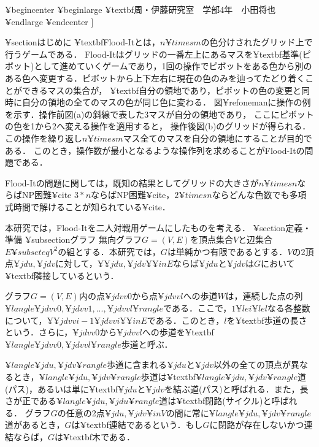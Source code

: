 ¥begin{center}
	¥begin{large}
		¥textbf{周・伊藤研究室　学部4年　小田将也}
	¥end{large}
¥end{center}
]

¥section{はじめに}
¥textbf{Flood-It}とは，$n ¥times m$の色分けされたグリッド上で行うゲームである．
Flood-Itはグリッドの一番左上にあるマスを¥textbf{基準(ピボット)}として進めていくゲームであり，1回の操作でピボットをある色から別のある色へ変更する．ピボットから上下左右に現在の色のみを辿ってたどり着くことができるマスの集合が，
¥textbf{自分の領地}であり，ピボットの色の変更と同時に自分の領地の全てのマスの色が同じ色に変わる．
図¥ref{oneman}に操作の例を示す．操作前図(a)の斜線で表した3マスが自分の領地であり，
ここにピボットの色を1から2へ変える操作を適用すると，
操作後図(b)のグリッドが得られる．この操作を繰り返し$n ¥times m$マス全てのマスを自分の領地にすることが目的である．
このとき，操作数が最小となるような操作列を求めることがFlood-Itの問題である．


Flood-Itの問題に関しては，既知の結果としてグリッドの大きさが$n ¥times n$ならばNP困難¥cite{}
$3*n$ならばNP困難¥cite，$2 ¥times n$ならどんな色数でも多項式時間で解けることが知られている¥cite{}．


本研究では，Flood-Itを二人対戦用ゲームにしたものを考える．
¥section{定義・準備}
¥subsection{グラフ}
無向グラフ$G=(V,E)$を頂点集合$V$と辺集合$E¥subseteq V^2$の組とする．本研究では，$G$は単純かつ有限であるとする．$V$の2頂点$¥jdu,¥jdv$に対して，$¥{¥jdu,¥jdv¥}¥in E$ならば$¥jdu$と$¥jdv$は$G$において¥textbf{隣接している}という．

グラフ$G=(V,E)$内の点$¥jdvv{0}$から点$¥jdvv{l}$への歩道$W$は，連続した点の列$¥langle ¥jdvv{0},¥jdvv{1},...,¥jdvv{l} ¥rangle$である．ここで，$1¥le i¥le l$なる各整数について，$¥{¥jdvv{{i-1}} ¥jdvv{i}¥}¥in E$である．このとき，$l$を¥textbf{歩道の長さ}という．さらに，$¥jdvv{0}$から$¥jdvv{l}$への歩道を¥textbf{$¥langle ¥jdvv{0},¥jdvv{l}¥rangle$歩道}と呼ぶ．

$¥langle ¥jdu,¥jdv ¥rangle$歩道に含まれる$¥jdu$と$¥jdv $以外の全ての頂点が異なるとき，$¥langle ¥jdu,¥jdv ¥rangle$歩道は¥textbf{$¥langle ¥jdu,¥jdv ¥rangle$道(パス)}，あるいは単に¥textbf{$¥jdu$と$¥jdv$を結ぶ道(パス)}と呼ばれる．また，長さが正である$¥langle ¥jdu,¥jdu ¥rangle$道は¥textbf{閉路(サイクル)}と呼ばれる．
グラフ$G$の任意の2点$¥jdu,¥jdv ¥in V$の間に常に$¥langle ¥jdu,¥jdv ¥rangle$道があるとき，$G$は¥textbf{連結}であるという．もし$G$に閉路が存在しないかつ連結ならば，$G$は¥textbf{木}である．

